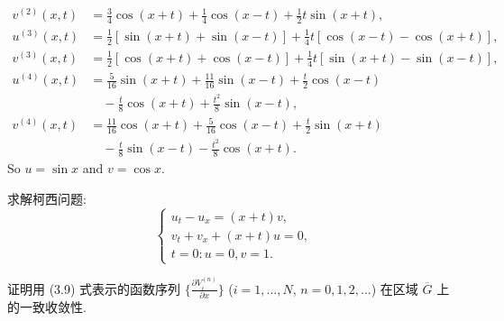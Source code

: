 \begin{solution}
\begin{enumerate}[(1)]
\begin{align*}
        v^{(2)}(x,t) & = \frac34 \cos(x+t) + \frac14 \cos(x-t) + \frac12 t\sin(x+t), \\
        u^{(3)}(x,t) & = \frac12 [\sin(x+t)+\sin(x-t)] + \frac14 t[\cos(x-t)-\cos(x+t)], \\
        v^{(3)}(x,t) & = \frac12 [\cos(x+t)+\cos(x-t)] + \frac14 t[\sin(x+t)-\sin(x-t)], \\
        u^{(4)}(x,t) & = \frac{5}{16}\sin(x+t) + \frac{11}{16} \sin(x-t) + \frac{t}{2}\cos(x-t) \\
                     & \quad -\frac{t}{8}\cos(x+t) + \frac{t^2}{8}\sin(x-t), \\
        v^{(4)}(x,t) & = \frac{11}{16} \cos(x+t) + \frac{5}{16}\cos(x-t) + \frac{t}{2}\sin(x+t) \\
                     & \quad -\frac{t}{8}\sin(x-t) - \frac{t^2}{8}\cos(x+t).
      \end{align*}
      So $u = \sin x$ and $v = \cos x$.
  \end{enumerate}
\end{solution}


\begin{exercise}
  求解柯西问题:
  \[\begin{cases}
    u_t - u_x = (x+t)v, \\
    v_t + v_x + (x+t)u = 0, \\
    t=0: u=0, v=1.
  \end{cases}\]
\end{exercise}


\begin{exercise}
  证明用 (3.9) 式表示的函数序列 $\bigl\{\frac{\partial V_i^{(n)}}{\partial x}\bigr\}$
  ($i=1,\ldots,N$, $n=0,1,2,\ldots$) 在区域 $\overline{G}$ 上的一致收敛性.
\end{exercise}

